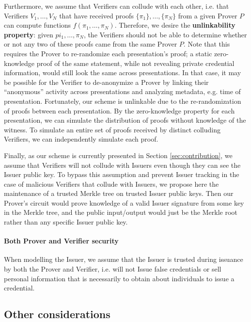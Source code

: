 Furthermore, we assume that Verifiers can collude with each other, i.e. that Verifiers $V_1, \dots, V_N$ that have received proofs $\{\pi_1\}, \dots, \{\pi_N\}$ from a given Prover $P$ can compute functions $f(\pi_1, \dots, \pi_N)$. 
Therefore, we desire the \textbf{unlinkability property}: given $pi_1, \dots, \pi_N$, the Verifiers should not be able to determine whether or not any two of these proofs came from the same Prover $P$.
Note that this requires the Prover to re-randomize each presentation's proof; a static zero-knowledge proof of the same statement, while not revealing private credential information, would still look the same across presentations.
In that case, it may be possible for the Verifier to de-anonymize a Prover by linking their ``anonymous'' activity across presentations and analyzing metadata, e.g. time of presentation.
Fortunately, our scheme is unlinkable due to the re-randomization of proofs between each presentation. By the zero-knowledge property for each presentation, we can simulate the distribution of proofs without knowledge of the witness. 
To simulate an entire set of proofs received by distinct colluding Verifiers, we can independently simulate each proof.  


Finally, as our scheme is currently presented in Section \ref{sec:contribution}, we assume that Verifiers will not collude with Issuers even though they can see the Issuer public key. 
To bypass this assumption and prevent Issuer tracking in the case of malicious Verifiers that collude with Issuers, 
we propose here the maintenance of a trusted Merkle tree on trusted Issuer public keys. 
Then our Prover's circuit would prove knowledge of a valid Issuer signature from some key in the Merkle tree, and the public input/output would just be the Merkle root rather than any specific Issuer public key.

\paragraph{Both Prover and Verifier security} When modelling the Issuer, we assume that the Issuer is trusted during issuance by both the Prover and Verifier, i.e. will not Issue false credentials or sell personal information that is necessarily to obtain about individuals to issue a credential.

\subsection{Other considerations}

